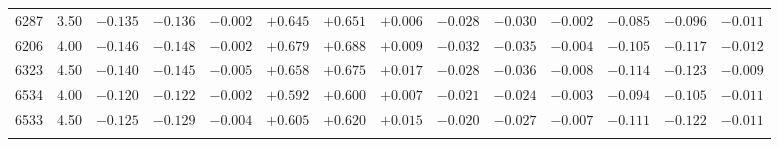 \documentclass[]{aa}
\begin{document}
\begin{appendix}
\begin{table*}
\begin{center}
\begin{tabular}{llllllllllllll}
6287  &3.50 & $-0.135$ &$ -0.136$ &$ -0.002$ &$ +0.645$ &$ +0.651$ &$ +0.006$ &$ -0.028$ &$ -0.030$ &$ -0.002$ &$ -0.085$&$ -0.096$&$ -0.011$\\
6206  &4.00 & $-0.146$ &$ -0.148$ &$ -0.002$ &$ +0.679$ &$ +0.688$ &$ +0.009$ &$ -0.032$ &$ -0.035$ &$ -0.004$ &$ -0.105$&$ -0.117$&$ -0.012$\\
6323  &4.50 & $-0.140$ &$ -0.145$ &$ -0.005$ &$ +0.658$ &$ +0.675$ &$ +0.017$ &$ -0.028$ &$ -0.036$ &$ -0.008$ &$ -0.114$&$ -0.123$&$ -0.009$\\
6534  &4.00 & $-0.120$ &$ -0.122$ &$ -0.002$ &$ +0.592$ &$ +0.600$ &$ +0.007$ &$ -0.021$ &$ -0.024$ &$ -0.003$ &$ -0.094$&$ -0.105$&$ -0.011$\\
6533  &4.50 & $-0.125$ &$ -0.129$ &$ -0.004$ &$ +0.605$ &$ +0.620$ &$ +0.015$ &$ -0.020$ &$ -0.027$ &$ -0.007$ &$ -0.111$&$ -0.122$&$ -0.011$\\
\hline\noalign{\smallskip}
\hline\noalign{\smallskip}
\end{tabular}
\end{center}
\end{table*}



\end{appendix}
\end{document}
